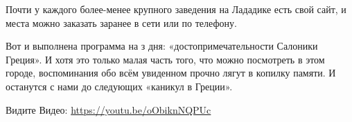 Почти у каждого более-менее крупного заведения на Лададике есть свой сайт, и места можно заказать заранее в сети или по телефону.

Вот и выполнена программа на з дня: «достопримечательности Салоники Греция». И хотя это только малая часть того, что можно посмотреть в этом городе, воспоминания обо всём увиденном прочно лягут в копилку памяти. И останутся с нами до следующих «каникул в Греции».

Видите Видео: \url{https://youtu.be/oObiknNQPUc}